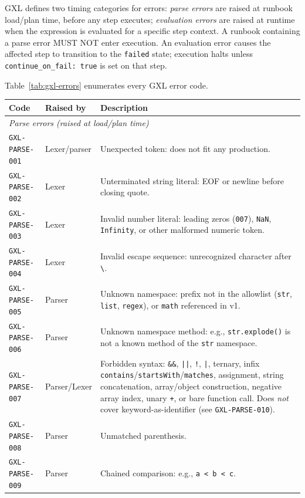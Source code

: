 GXL defines two timing categories for errors:
\emph{parse errors} are raised at runbook load/plan time, before any step
executes;
\emph{evaluation errors} are raised at runtime when the expression is
evaluated for a specific step context.
A runbook containing a parse error MUST NOT enter execution.
An evaluation error causes the affected step to transition to the
\texttt{failed} state; execution halts unless \texttt{continue\_on\_fail:~true}
is set on that step.

Table~\ref{tab:gxl-errors} enumerates every GXL error code.

\begin{table}[ht]
\centering
\begin{tabular}{p{3.0cm}p{3.0cm}p{7.0cm}}
\hline
\textbf{Code} & \textbf{Raised by} & \textbf{Description} \\
\hline
\multicolumn{3}{l}{\textit{Parse errors (raised at load/plan time)}} \\
\hline
\texttt{GXL-PARSE-001} & Lexer/parser & Unexpected token: does not fit any production. \\
\texttt{GXL-PARSE-002} & Lexer & Unterminated string literal: EOF or newline before closing quote. \\
\texttt{GXL-PARSE-003} & Lexer & Invalid number literal: leading zeros (\texttt{007}), \texttt{NaN}, \texttt{Infinity}, or other malformed numeric token. \\
\texttt{GXL-PARSE-004} & Lexer & Invalid escape sequence: unrecognized character after \texttt{\textbackslash}. \\
\texttt{GXL-PARSE-005} & Parser & Unknown namespace: prefix not in the allowlist (\texttt{str}, \texttt{list}, \texttt{regex}), or \texttt{math} referenced in v1. \\
\texttt{GXL-PARSE-006} & Parser & Unknown namespace method: e.g., \texttt{str.explode()} is not a known method of the \texttt{str} namespace. \\
\texttt{GXL-PARSE-007} & Parser/Lexer & Forbidden syntax: \texttt{\&\&}, \texttt{||}, \texttt{!}, \texttt{|}, ternary, infix \texttt{contains}/\texttt{startsWith}/\texttt{matches}, assignment, string concatenation, array/object construction, negative array index, unary \texttt{+}, or bare function call. Does \emph{not} cover keyword-as-identifier (see \texttt{GXL-PARSE-010}). \\
\texttt{GXL-PARSE-008} & Parser & Unmatched parenthesis. \\
\texttt{GXL-PARSE-009} & Parser & Chained comparison: e.g., \texttt{a < b < c}. \\

\end{tabular}
\end{table}
